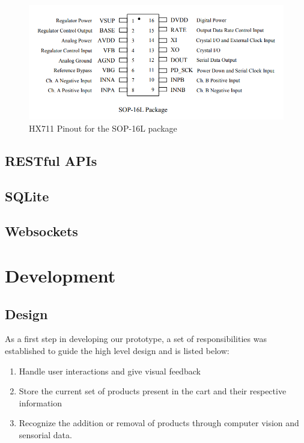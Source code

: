 \documentclass[openright]{normas-utf-tex} %
\begin{document}
\begin{figure}[H]
	\centering
	\includegraphics[width=1\textwidth]{./images/hx711-pinout.png}
	\caption[HX711 Pinout for the SOP-16L package]{HX711 Pinout for the SOP-16L package}
	\label{fig:architecture}
\end{figure}

\section{RESTful APIs}

\section{SQLite}

\section{Websockets}

\chapter{Development}
\label{chap:desenv}

\section{Design}

As a first step in developing our prototype, a set of
responsibilities was established to guide the high level design and is listed below:

\begin{enumerate}
    \item Handle user interactions and give visual feedback
    \item Store the current set of products present in the cart and their respective information
    \item Recognize the addition or removal of products through computer vision and sensorial data.
\end{enumerate}
\end{document}
